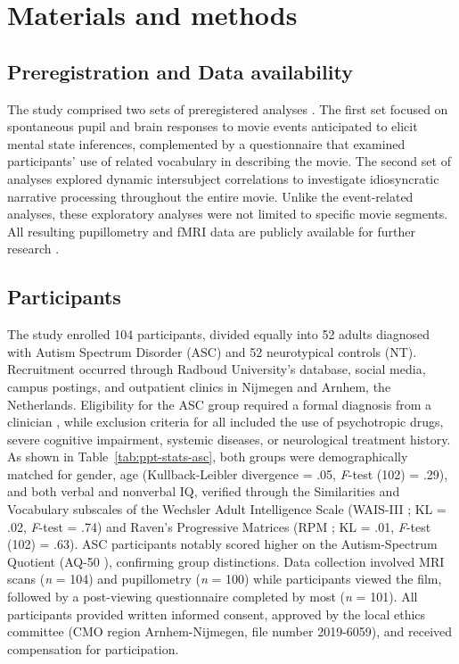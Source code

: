 \section{Materials and methods}
\subsection{Preregistration and Data availability}
The study comprised two sets of preregistered analyses \citep{mangnus2022}. The first set focused on spontaneous pupil and brain responses to movie events anticipated to elicit mental state inferences, complemented by a questionnaire that examined participants' use of related vocabulary in describing the movie. The second set of analyses explored dynamic intersubject correlations to investigate idiosyncratic narrative processing throughout the entire movie. Unlike the event-related analyses, these exploratory analyses were not limited to specific movie segments. All resulting pupillometry and fMRI data are publicly available for further research \citep{mangnus2024dataset}. 

\subsection{Participants} 
The study enrolled 104 participants, divided equally into 52 adults diagnosed with Autism Spectrum Disorder (ASC) and 52 neurotypical controls (NT). Recruitment occurred through Radboud University's database, social media, campus postings, and outpatient clinics in Nijmegen and Arnhem, the Netherlands. Eligibility for the ASC group required a formal diagnosis from a clinician \citep{apa2013}, while exclusion criteria for all included the use of psychotropic drugs, severe cognitive impairment, systemic diseases, or neurological treatment history. As shown in Table~\ref{tab:ppt-stats-asc}, both groups were demographically matched for gender, age (Kullback-Leibler divergence = .05, \textit{F}-test (102) = .29), and both verbal and nonverbal IQ, verified through the Similarities and Vocabulary subscales of the Wechsler Adult Intelligence Scale (WAIS-III \citep{wechsler1997}; KL = .02, \textit{F}-test = .74) and Raven's Progressive Matrices (RPM \citep{raven1989}; KL = .01, \textit{F}-test (102) = .63). ASC participants notably scored higher on the Autism-Spectrum Quotient (AQ-50 \citep{baron-cohen2001AQ}), confirming group distinctions. Data collection involved MRI scans (\textit{n} = 104) and pupillometry (\textit{n} = 100) while participants viewed the film, followed by a post-viewing questionnaire completed by most (\textit{n} = 101). All participants provided written informed consent, approved by the local ethics committee (CMO region Arnhem-Nijmegen, file number 2019-6059), and received compensation for participation.

